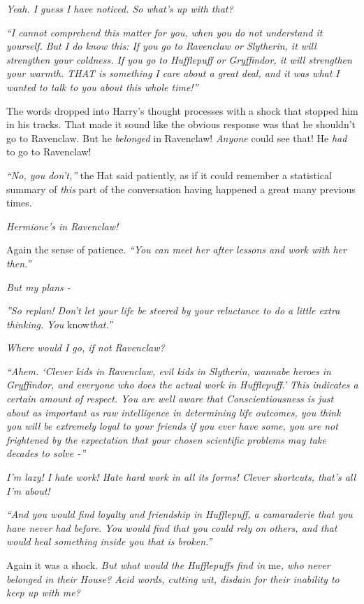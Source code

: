 \emph{Yeah. I guess I have noticed. So what's up with that?}

\emph{``I cannot comprehend this matter for you, when you do not
understand it yourself. But I do know this: If you go to Ravenclaw or
Slytherin, it will strengthen your coldness. If you go to Hufflepuff or
Gryffindor, it will strengthen your warmth. THAT is something I care
about a great deal, and it was what I wanted to talk to you about this
whole time!''}

The words dropped into Harry's thought processes with a shock that
stopped him in his tracks. That made it sound like the obvious response
was that he shouldn't go to Ravenclaw. But he \emph{belonged} in
Ravenclaw! \emph{Anyone} could see that! He \emph{had} to go to
Ravenclaw!

\emph{``No, you don't,''} the Hat said patiently, as if it could
remember a statistical summary of \emph{this} part of the conversation
having happened a great many previous times.

\emph{Hermione's in Ravenclaw!}

Again the sense of patience. \emph{``You can meet her after lessons and
work with her then.''}

\emph{But my plans -}

\emph{''So replan! Don't let your life be steered by your reluctance to
do a little extra thinking. You} know\emph{that.''}

\emph{Where would I go, if not Ravenclaw?}

\emph{``Ahem. `Clever kids in Ravenclaw, evil kids in Slytherin, wannabe
heroes in Gryffindor, and everyone who does the actual work in
Hufflepuff.' This indicates a certain amount of respect. You are well
aware that Conscientiousness is just about as important as raw
intelligence in determining life outcomes, you think you will be
extremely loyal to your friends if you ever have some, you are not
frightened by the expectation that your chosen scientific problems may
take decades to solve -''}

\emph{I'm lazy! I hate work! Hate hard work in all its forms! Clever
shortcuts, that's all I'm about!}

\emph{``And you would find loyalty and friendship in Hufflepuff, a
camaraderie that you have never had before. You would find that you
could rely on others, and that would heal something inside you that is
broken.''}

Again it was a shock. \emph{But what would the Hufflepuffs find in}
me\emph{, who never belonged in their House? Acid words, cutting wit,
disdain for their inability to keep up with me?}

